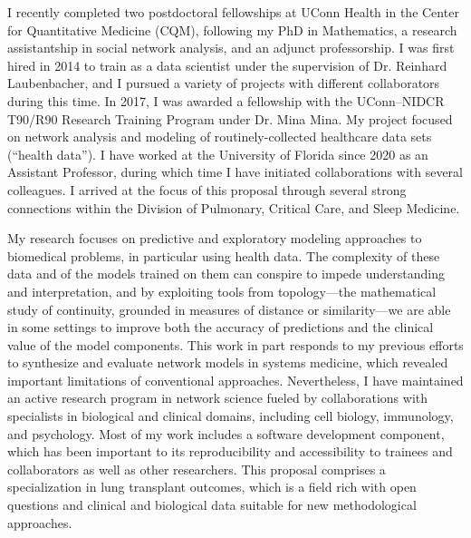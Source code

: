\documentclass{nihbiosketch}
\begin{document}
\begin{statement}

I recently completed two postdoctoral fellowships at UConn Health in the Center for Quantitative Medicine (CQM), following my PhD in Mathematics, a research assistantship in social network analysis, and an adjunct professorship.
I was first hired in 2014 to train as a data scientist under the supervision of Dr. Reinhard Laubenbacher, and I pursued a variety of projects with different collaborators during this time.
In 2017, I was awarded a fellowship with the UConn--NIDCR T90/R90 Research Training Program under Dr. Mina Mina. My project focused on network analysis and modeling of routinely-collected healthcare data sets (``health data'').
I have worked at the University of Florida since 2020 as an Assistant Professor, during which time I have initiated collaborations with several colleagues. I arrived at the focus of this proposal through several strong connections within the Division of Pulmonary, Critical Care, and Sleep Medicine.

My research focuses on predictive and exploratory modeling approaches to biomedical problems, in particular using health data. The complexity of these data and of the models trained on them  can conspire to impede understanding and interpretation, and by exploiting tools from topology---the mathematical study of continuity, grounded in measures of distance or similarity---we are able in some settings to improve both the accuracy of predictions and the clinical value of the model components. This work in part responds to my previous efforts to synthesize and evaluate network models in systems medicine, which revealed important limitations of conventional approaches.
Nevertheless, I have maintained an active research program in network science fueled by collaborations with specialists in biological and clinical domains, including cell biology, immunology, and psychology.
Most of my work includes a software development component, which has been important to its reproducibility and accessibility to trainees and collaborators as well as other researchers.
This proposal comprises a specialization in lung transplant outcomes, which is a field rich with open questions and clinical and biological data suitable for new methodological approaches.


\end{statement}
\end{document}
